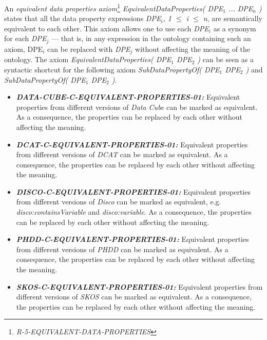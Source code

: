 \documentclass{llncs}
\begin{document}
An \emph{equivalent data properties axiom}\footnote{\emph{R-5-EQUIVALENT-DATA-PROPERTIES}} \emph{EquivalentDataProperties( DPE$_1$ ... DPE$_n$ )} states that all the data property expressions \emph{DPE$_i$, 1 $\leq$ i $\leq$ n}, are semantically equivalent to each other. This axiom allows one to use each \emph{DPE$_i$} as a synonym for each \emph{DPE$_j$} — that is, in any expression in the ontology containing such an axiom, DPE$_i$ can be replaced with \emph{DPE$_j$} without affecting the meaning of the ontology. The axiom \emph{EquivalentDataProperties( DPE$_1$ DPE$_2$ )} can be seen as a syntactic shortcut for the following axiom \emph{SubDataPropertyOf( DPE$_1$ DPE$_2$ )} and \emph{SubDataPropertyOf( DPE$_1$ DPE$_2$ )}.

\begin{itemize}
	\item \textbf{{\em DATA-CUBE-C-EQUIVALENT-PROPERTIES-01:}}
	Equivalent properties from different versions of \emph{Data Cube} can be marked as equivalent. 
	As a consequence, the properties can be replaced by each other without affecting the meaning.
\end{itemize}

\begin{itemize}
	\item \textbf{{\em DCAT-C-EQUIVALENT-PROPERTIES-01:}}
	Equivalent properties from different versions of \emph{DCAT} can be marked as equivalent. 
	As a consequence, the properties can be replaced by each other without affecting the meaning.
\end{itemize}

\begin{itemize}
	\item \textbf{{\em DISCO-C-EQUIVALENT-PROPERTIES-01:}}
	Equivalent properties from different versions of \emph{Disco} can be marked as equivalent, e.g. \emph{disco:containsVariable} and \emph{disco:variable}. 
	As a consequence, the properties can be replaced by each other without affecting the meaning.
\end{itemize}

\begin{itemize}
	\item \textbf{{\em PHDD-C-EQUIVALENT-PROPERTIES-01:}}
	Equivalent properties from different versions of \emph{PHDD} can be marked as equivalent. 
	As a consequence, the properties can be replaced by each other without affecting the meaning.
\end{itemize}

\begin{itemize}
	\item \textbf{{\em SKOS-C-EQUIVALENT-PROPERTIES-01:}}
	Equivalent properties from different versions of \emph{SKOS} can be marked as equivalent. 
	As a consequence, the properties can be replaced by each other without affecting the meaning.
\end{itemize}
\end{document}

